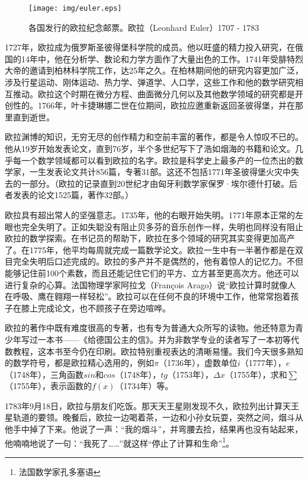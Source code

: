 \documentclass{article}
\begin{document}
\begin{figure}[htbp]
 \centering
 \texttt{[image: img/euler.eps]}
 \captionsetup{labelformat=empty}
 \caption{各国发行的欧拉纪念邮票。欧拉（Leonhard Euler）1707 - 1783}
 \label{fig:Leonhard-Euler}
\end{figure}

1727年，欧拉成为俄罗斯圣彼得堡科学院的成员。他以旺盛的精力投入研究，在俄国的14年中，他在分析学、数论和力学方面作了大量出色的工作。1741年受腓特烈大帝的邀请到柏林科学院工作，达25年之久。在柏林期间他的研究内容更加广泛，涉及行星运动、刚体运动、热力学、弹道学、人口学，这些工作和他的数学研究相互推动。欧拉这个时期在微分方程、曲面微分几何以及其他数学领域的研究都是开创性的。1766年，叶卡捷琳娜二世在位期间，欧拉应邀重新返回圣彼得堡，并在那里直到逝世。

欧拉渊博的知识，无穷无尽的创作精力和空前丰富的著作，都是令人惊叹不已的。他从19岁开始发表论文，直到76岁，半个多世纪写下了浩如烟海的书籍和论文。几乎每一个数学领域都可以看到欧拉的名字。欧拉是科学史上最多产的一位杰出的数学家，一生发表论文共计856篇，专著31部。这还不包括1771年圣彼得堡火灾中失去的一部分。（欧拉的记录直到20世纪才由匈牙利数学家保罗·埃尔德什打破。后者发表的论文1525篇，著作32部。\cite{Wiki-Euler}）

欧拉具有超出常人的坚强意志。1735年，他的右眼开始失明。1771年原本正常的左眼也完全失明了。正如失聪没有阻止贝多芬的音乐创作一样，失明也同样没有阻止欧拉的数学探索\cite{HanXueTao2009}。在书记员的帮助下，欧拉在多个领域的研究其实变得更加高产了。在1775年，他平均每周就完成一篇数学论文。欧拉一生中有一半著作都是在双目完全失明后口述完成的。欧拉的多产并不是偶然的，他有着惊人的记忆力。不但能够记住前100个素数，而且还能记住它们的平方、立方甚至更高次方。他还可以进行复杂的心算。法国物理学家阿拉戈（François Arago）说“欧拉计算时就像人在呼吸、鹰在翱翔一样轻松”。欧拉可以在任何不良的环境中工作，他常常抱着孩子在膝上完成论文，也不顾孩子在旁边喧哗。

欧拉的著作中既有难度很高的专著，也有专为普通大众所写的读物。他还特意为青少年写过一本书——《给德国公主的信》。并为非数学专业的读者写了一本初等代数教程，这本书至今仍在印刷。欧拉特别重视表达的清晰易懂。我们今天很多熟知的数学符号，都是欧拉精心选用的，例如$\pi$（1736年），虚数单位$i$（1777年），$e$（1748年），三角函数$sin$和$cos$（1748年），$tg$（1753年），$\Delta x$（1755年），求和$\sum$（1755年），表示函数的$f(x)$（1734年）等\cite{HanXueTao2009}。

1783年9月18日，欧拉与朋友们吃饭。那天天王星刚发现不久，欧拉列出计算天王星轨道的要领。晚餐后，欧拉一边喝着茶，一边和小孙女玩耍，突然之间，烟斗从他手中掉了下来。他说了一声：“我的烟斗”，并弯腰去捡，结果再也没有站起来，他喃喃地说了一句：“我死了……”就这样“停止了计算和生命”\footnote{法国数学家孔多塞语}。
\end{document}
